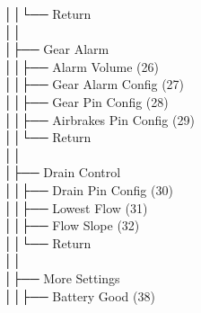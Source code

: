 │\hspace{2em}│\hspace{2em}└── Return \\
│\hspace{2em}│\hspace{2em} \\
│\hspace{2em}├── Gear Alarm \\
│\hspace{2em}│\hspace{2em}├── Alarm Volume (26) \\
│\hspace{2em}│\hspace{2em}├── Gear Alarm Config (27) \\
│\hspace{2em}│\hspace{2em}├── Gear Pin Config (28) \\
│\hspace{2em}│\hspace{2em}├── Airbrakes Pin Config (29) \\
│\hspace{2em}│\hspace{2em}└── Return \\
│\hspace{2em}│\hspace{2em} \\
│\hspace{2em}├── Drain Control \\
│\hspace{2em}│\hspace{2em}├── Drain Pin Config (30) \\
│\hspace{2em}│\hspace{2em}├── Lowest Flow (31) \\
│\hspace{2em}│\hspace{2em}├── Flow Slope (32) \\
│\hspace{2em}│\hspace{2em}└── Return \\
│\hspace{2em}│\hspace{2em} \\
│\hspace{2em}├── More Settings \\
│\hspace{2em}│\hspace{2em}├── Battery Good (38) \\
